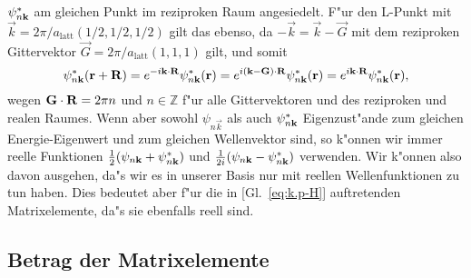 $\psi^{\ast}_{n\mathbf{k}}$ am gleichen Punkt im reziproken Raum angesiedelt.
F"ur den L-Punkt mit $\vec{k} = 2\pi/a_{\text{latt}} (1/2,1/2,1/2)$ gilt das
ebenso, da $-\vec{k} = \vec{k}- \vec{G}$ mit dem reziproken Gittervektor
$\vec{G} = 2\pi/a_{\text{latt}} (1,1,1)$ gilt, und somit
%
\begin{displaymath}
  \psi^{\ast}_{n\mathbf{k}}(\mathbf{r} + \mathbf{R}) = 
  e^{-i\mathbf{k} \cdot \mathbf{R} } \psi^{\ast}_{n\mathbf{k}}(\mathbf{r}) =
  e^{i\mathbf{(k-G)} \cdot \mathbf{R} } \psi^{\ast}_{n\mathbf{k}}(\mathbf{r}) =
  e^{i\mathbf{k} \cdot \mathbf{R} } \psi^{\ast}_{n\mathbf{k}}(\mathbf{r}),
\end{displaymath}
%
wegen $\mathbf{G} \cdot \mathbf{R} =2\pi n$ und $n \in \mathbb{Z}$ f"ur alle Gittervektoren
 und  des reziproken und realen Raumes. Wenn aber sowohl
$\psi_{n\vec{k}}$ als auch $\psi^{\ast}_{n\mathbf{k}}$ Eigenzust"ande zum gleichen
Energie-Eigenwert und zum gleichen Wellenvektor sind, so k"onnen wir immer
reelle Funktionen $\frac{1}{2}(\psi_{n\mathbf{k}} + \psi^{\ast}_{n\mathbf{k}})$ und
$\frac{1}{2i}(\psi_{n\mathbf{k}} - \psi^{\ast}_{n\mathbf{k}})$ verwenden. Wir k"onnen
also davon ausgehen, da"s wir es in unserer Basis nur mit reellen
Wellenfunktionen zu tun haben. Dies bedeutet aber f"ur die in  [Gl.~\eqref{eq:k.p-H}] auftretenden Matrixelemente, da"s sie
ebenfalls reell sind. 


\subsection{Betrag der Matrixelemente}
\label{sec:betrag}

